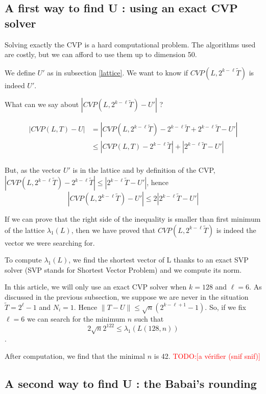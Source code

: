 \documentclass[preprint,svgnames]{iacrtrans}
\newcommand{\todo}[1]{\textcolor{red}{TODO:[#1]}}
\begin{document}
\subsection{A first way to find U : using an exact CVP solver}

Solving exactly the CVP is a hard computational problem. The algorithms used are costly, but we can afford to use them up to dimension 50.

We define \(U'\) as in subsection \ref{lattice}. We want to know if \(CVP(L,2^{k-\ell}\widetilde{T})\) is indeed \(U'\).

What can we say about \(|CVP(L,2^{k-\ell}\widetilde{T})-U'|\) ?

\begin{align*}
|CVP(L,T)-U| &= |CVP(L,2^{k-\ell}\widetilde{T})-2^{k-\ell}\widetilde{T}+2^{k-\ell}\widetilde{T}-U'|\\
& \leqslant |CVP(L,T)-2^{k-\ell}\widetilde{T}|+|2^{k-\ell}\widetilde{T}-U'|\\
\end{align*}

But, as the vector \(U'\) is in the lattice and by definition of the CVP, \(|CVP(L,2^{k-\ell}\widetilde{T})-2^{k-\ell}\widetilde{T}| \leqslant |2^{k-\ell}\widetilde{T}-U'| \), hence 
\[|CVP(L,2^{k-\ell}\widetilde{T})-U'|\leqslant 2|2^{k-\ell}\widetilde{T}-U'|\]

If we can prove that the right side of the inequality is smaller than first minimum of the lattice \(\lambda_1(L)\), then we have proved that \(CVP(L,2^{k-\ell}\widetilde{T})\) is indeed the vector we were searching for.

To compute \(\lambda_1(L)\), we find the shortest vector of L thanks to an exact SVP solver (SVP stands for Shortest Vector Problem) and we compute its norm.


In this article, we will only use an exact CVP solver when \(k = 128\) and \(\ell = 6\). As discussed in the previous subsection, we suppose we are never in the situation\(\widetilde{T} = 2^\ell-1\) and \(N_i=1\). Hence \(\lVert T-U \rVert \leqslant \sqrt{n}(2^{k-\ell+1}-1) \). So, if we fix \(\ell = 6\) we can search for the minimum \(n\) such that \[2\sqrt{n}2^{122} \leqslant \lambda_1(L(128,n))\].

After computation, we find that the minimal \(n\) is 42. \todo{a vérifier (snif snif)}


\subsection{A second way to find U : the Babai's rounding}
\end{document}
